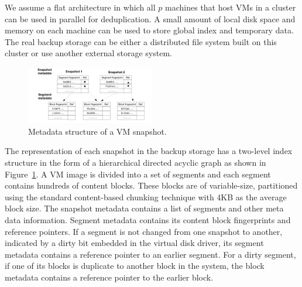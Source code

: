 We assume a flat architecture in which  all $p$ machines that host VMs in a cluster can 
be used in parallel for deduplication. 
A small amount of local disk space and memory on each machine can be used 
to store global index and temporary data. 
The real backup storage can be either a distributed file system built on
this cluster  or use another  external storage system. 



\begin{figure}
\centering
\includegraphics[width=0.5\textwidth]{snapshotdata.pdf}
\caption{ Metadata structure of a VM snapshot.}
\label{fig:snapshot}
\end{figure}

The representation of each snapshot in the backup storage
has a two-level index structure in the form of a hierarchical
directed acyclic graph as shown in Figure~\ref{fig:snapshot}.
A VM image is divided into a set of segments and each  segment contains hundreds of content blocks. 
These blocks are of variable-size, partitioned using
the standard content-based chunking technique with 4KB as the average block size. 
The snapshot metadata  contains a list of segments and other meta data information.
Segment metadata  contains its  content block fingerprints and reference pointers. 
If a segment is not changed from one snapshot to another, indicated by a dirty bit embedded in the virtual disk driver, 
its segment metadata contains a reference pointer to an earlier segment.
For a dirty segment, if one of its blocks is duplicate to another block in the system,  
the block metadata contains a reference pointer to the earlier block.





